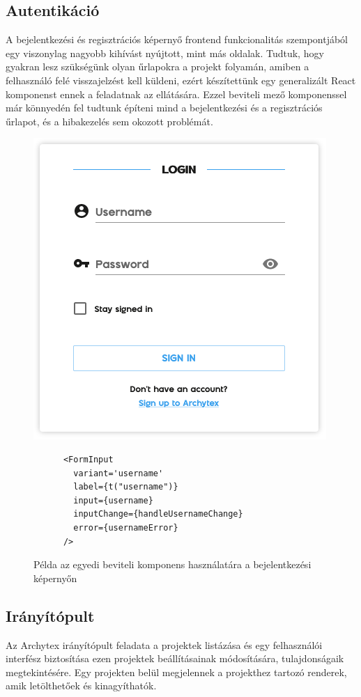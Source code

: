 \subsection{Autentikáció}
A bejelentkezési és regisztrációs képernyő frontend funkcionalitás szempontjából egy viszonylag nagyobb kihívást nyújtott, mint más oldalak. Tudtuk, hogy gyakran lesz szükségünk olyan űrlapokra a projekt folyamán, amiben a felhasználó felé visszajelzést kell küldeni, ezért készítettünk egy generalizált React komponenst ennek a feladatnak az ellátására. Ezzel beviteli mező komponenssel már könnyedén fel tudtunk építeni mind a bejelentkezési és a regisztrációs űrlapot, és a hibakezelés sem okozott problémát.

\begin{figure}[h]
  \centering
  \begin{minipage}{.5\textwidth}
    \centering
    \includegraphics[width=.6\linewidth]{parts/developer-documentation/frontend/images/login.png}
    \label{fig:loginPage}
  \end{minipage}%
  \begin{minipage}{.5\textwidth}
    \centering
    \begin{lstlisting}
      <FormInput
        variant='username'
        label={t("username")}
        input={username}
        inputChange={handleUsernameChange}
        error={usernameError}
      />\end{lstlisting}
  \end{minipage}
  \caption{Példa az egyedi beviteli komponens használatára a bejelentkezési képernyőn}
\end{figure}

\pagebreak

\subsection{Irányítópult}
Az Archytex irányítópult feladata a projektek listázása és egy felhasználói interfész biztosítása ezen projektek beállításainak módosítására, tulajdonságaik megtekintésére. Egy projekten belül megjelennek a projekthez tartozó renderek, amik letölthetőek és kinagyíthatók.

